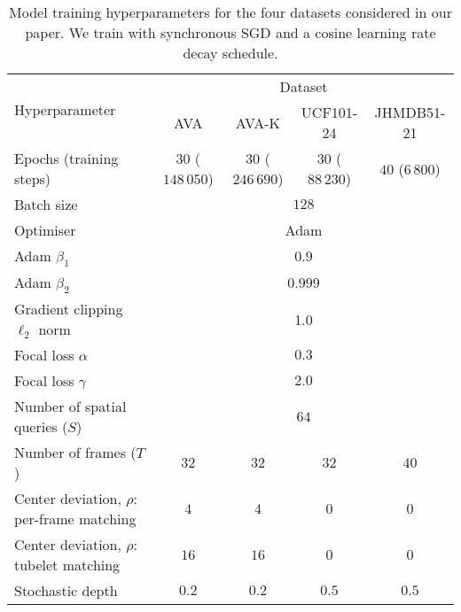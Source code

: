 \documentclass[10pt,twocolumn,letterpaper]{article}
\begin{document}
\begin{table*}[t]
\centering
\caption{Model training hyperparameters for the four datasets considered in our paper. We train with synchronous SGD and a cosine learning rate decay schedule.
}
\begin{tabular}{lcccc}
\toprule
\multirow{2}{*}{Hyperparameter} & \multicolumn{4}{c}{Dataset} \\
\cmidrule(l){2-5}
               & AVA & AVA-K & UCF101-24 & JHMDB51-21 \\
\midrule
Epochs (training steps) & $30$ ($148\,050$) & $30$ ($246\,690$) & $30$ ($88\,230$) & $40$ ($6\,800$) \\
Batch size & \multicolumn{4}{c}{$128$} \\
Optimiser & \multicolumn{4}{c}{Adam \cite{kingma2014adam}} \\
Adam $\beta_1$ & \multicolumn{4}{c}{$0.9$} \\
Adam $\beta_2$ & \multicolumn{4}{c}{$0.999$} \\
Gradient clipping $\ell_2$ norm & \multicolumn{4}{c}{1.0} \\
Focal loss $\alpha$  & \multicolumn{4}{c}{$0.3$} \\
Focal loss $\gamma$ & \multicolumn{4}{c}{$2.0$} \\
Number of spatial queries ($S$) &\multicolumn{4}{c}{$64$} \\
Number of frames ($T$) & $32$ & $32$ & $32$ & $40$ \\
Center deviation, $\rho$: per-frame matching & $4$ & $4$ & $0$ & $0$ \\
Center deviation, $\rho$: tubelet matching & $16$ & $16$ & $0$ & $0$ \\
Stochastic depth~\cite{huang_stochasticdepth_eccv_2016} & $0.2$ & $0.2$ & $0.5$ & $0.5$ \\






\bottomrule
\end{tabular}
\label{tab:hyperparamters}
\end{table*}
 
\end{document}
